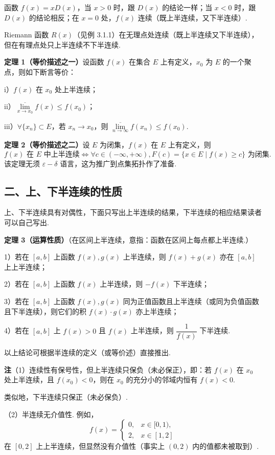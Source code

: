 \documentclass[UTF8, 12pt, fontset=fandol, oneside]{ctexart}
\begin{document}
函数 $f(x)=xD(x)$，当 $x>0$ 时，跟 $D(x)$ 的结论一样；当 $x<0$ 时，跟 $D(x)$ 的结论相反；在 $x=0$ 处，$f(x)$ 连续（既上半连续，又下半连续）.

Riemann 函数 $R(x)$（见例 3.1.1）在无理点处连续（既上半连续又下半连续），但在有理点处只上半连续不下半连续.

\noindent\textbf{定理 1（等价描述之一）}\quad 设函数 $f(x)$ 在集合 $E$ 上有定义，$x_0$ 为 $E$ 的一个聚点，则如下断言等价：

i）$f(x)$ 在 $x_0$ 处上半连续；

ii）$\overline{\lim\limits_{x\to x_0}}f(x)\le f(x_0)$；

iii）$\forall\{x_n\}\subset E$，若 $x_n\to x_0$，则 $\overline{\lim\limits_{n\to\infty}}f(x_n)\le f(x_0)$.

\noindent\textbf{定理 2（等价描述之二）}\quad 设 $E$ 为闭集，$f(x)$ 在 $E$ 上有定义，则
\[
  f(x)\text{ 在 }E\text{ 中上半连续}
  \Longleftrightarrow \forall c\in(-\infty,+\infty),F(c)=\{x\in E\mid f(x)\ge c\}\text{ 为闭集}.
\]
该定理无须 $\varepsilon-\delta$ 语言，这为推广到点集拓扑作了准备.

\subsection*{二、上、下半连续的性质}

上、下半连续具有对偶性，下面只写出上半连续的结果，下半连续的相应结果读者可以自己写出.

\noindent\textbf{定理 3（运算性质）}\quad （在区间上半连续，意指：函数在区间上每点都上半连续.）

1）若在 $[a,b]$ 上函数 $f(x),g(x)$ 上半连续，则 $f(x)+g(x)$ 亦在 $[a,b]$ 上上半连续；

2）若在 $[a,b]$ 上函数 $f(x)$ 上半连续，则 $-f(x)$ 下半连续；

3）若在 $[a,b]$ 上函数 $f(x),g(x)$ 同为正值函数且上半连续（或同为负值函数且下半连续），则它们的积 $f(x)\cdot g(x)$ 亦上半连续；

4）若在 $[a,b]$ 上 $f(x)>0$ 且 $f(x)$ 上半连续，则 $\dfrac1{f(x)}$ 下半连续.

以上结论可根据半连续的定义（或等价述）直接推出.

\noindent\textbf{注}\quad （1）连续性有保号性，但上半连续只保负（未必保正），即：若 $f(x)$ 在 $x_0$ 处上半连续，且 $f(x_0)<0$，则在 $x_0$ 的充分小的邻域内恒有 $f(x)<0$.

类似地，下半连续只保正（未必保负）.

（2）半连续无介值性. 例如，
\[
  f(x)=
  \begin{cases}
    0, & x\in[0,1),\\
    2, & x\in[1,2]
  \end{cases}
\]
在 $[0,2]$ 上上半连续，但显然没有介值性（事实上 $(0,2)$ 内的值都未被取到）.
\end{document}
